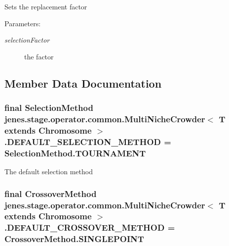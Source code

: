 Sets the replacement factor

\begin{Desc}
\item[Parameters:]
\begin{description}
\item[{\em selectionFactor}]the factor \end{description}
\end{Desc}


\subsection{Member Data Documentation}
\hypertarget{classjenes_1_1stage_1_1operator_1_1common_1_1_multi_niche_crowder_3_01_t_01extends_01_chromosome_01_4_ddd3f5fe352248ed9d5639e0d138f59d}{
\subsubsection[DEFAULT\_\-SELECTION\_\-METHOD]{\setlength{\rightskip}{0pt plus 5cm}final {\bf SelectionMethod} jenes.stage.operator.common.MultiNicheCrowder$<$ T extends Chromosome $>$.{\bf DEFAULT\_\-SELECTION\_\-METHOD} = SelectionMethod.TOURNAMENT}}
\label{classjenes_1_1stage_1_1operator_1_1common_1_1_multi_niche_crowder_3_01_t_01extends_01_chromosome_01_4_ddd3f5fe352248ed9d5639e0d138f59d}


The default selection method \hypertarget{classjenes_1_1stage_1_1operator_1_1common_1_1_multi_niche_crowder_3_01_t_01extends_01_chromosome_01_4_ed986ca7d89144f78e73a11a5fb2f032}{
\subsubsection[DEFAULT\_\-CROSSOVER\_\-METHOD]{\setlength{\rightskip}{0pt plus 5cm}final {\bf CrossoverMethod} jenes.stage.operator.common.MultiNicheCrowder$<$ T extends Chromosome $>$.{\bf DEFAULT\_\-CROSSOVER\_\-METHOD} = CrossoverMethod.SINGLEPOINT}}
\label{classjenes_1_1stage_1_1operator_1_1common_1_1_multi_niche_crowder_3_01_t_01extends_01_chromosome_01_4_ed986ca7d89144f78e73a11a5fb2f032}


